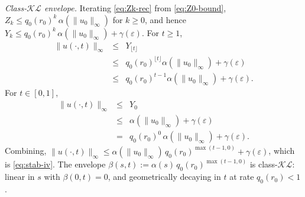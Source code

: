 \documentclass[twocolumn,amsthm]{autart}
\newcommand{\eps}{\varepsilon}
\theoremstyle{plain}
\theoremstyle{definition}
\begin{document}
\emph{Class-$\mathcal{KL}$ envelope.} Iterating \eqref{eq:Zk-rec} from \eqref{eq:Z0-bound}, $Z_k \le q_0(r_0)^k\,\alpha(\|u_0\|_\infty)$ for $k \ge 0$, and hence $Y_k \le q_0(r_0)^k\,\alpha(\|u_0\|_\infty) + \gamma(\eps)$. For $t \ge 1$,
\begin{eqnarray}
\|u(\cdot,t)\|_\infty &\le& Y_{\lfloor t \rfloor} \nonumber \\
&\le& q_0(r_0)^{\lfloor t \rfloor}\alpha(\|u_0\|_\infty) + \gamma(\eps) \nonumber \\
&\le& q_0(r_0)^{t-1}\alpha(\|u_0\|_\infty) + \gamma(\eps).
\label{eq:u-bound-tge1}
\end{eqnarray}
For $t \in [0, 1]$,
\begin{eqnarray}
\|u(\cdot,t)\|_\infty &\le& Y_0 \nonumber \\
&\le& \alpha(\|u_0\|_\infty) + \gamma(\eps) \nonumber \\
&=& q_0(r_0)^0\,\alpha(\|u_0\|_\infty) + \gamma(\eps).
\label{eq:u-bound-tle1}
\end{eqnarray}
Combining, $\|u(\cdot,t)\|_\infty \le \alpha(\|u_0\|_\infty)\,q_0(r_0)^{\max(t-1, 0)} + \gamma(\eps)$, which is \eqref{eq:stab-iv}. The envelope $\beta(s, t) := \alpha(s)\,q_0(r_0)^{\max(t-1, 0)}$ is class-$\mathcal{KL}$: linear in $s$ with $\beta(0, t) = 0$, and geometrically decaying in $t$ at rate $q_0(r_0) < 1$.
\end{document}
